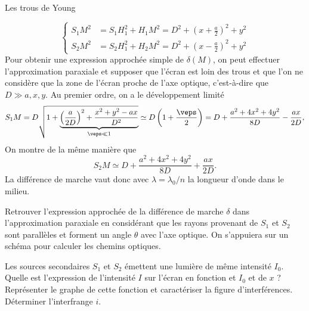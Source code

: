 \begin{exo}[PC][1]{Les trous de Young}
\begin{quest}
{  \begin{equation*}
    \begin{cases}
        S_1 M^2 & = S_1H_1^2 +H_1M^2 = D^2 + (x + \frac{a}{2})^2 + y^2 \\ 
        S_2 M^2 & = S_2H_1^2 +H_2M^2 = D^2 + (x - \frac{a}{2})^2 + y^2
    \end{cases}
    \end{equation*}
  Pour obtenir une expression approchée simple de $\delta(M)$, on peut effectuer l'approximation paraxiale et supposer que l'écran est loin des trous et que l'on ne considère que la zone de l'écran proche de l'axe optique, c'est-à-dire que $D \gg a,x,y$.
   Au premier ordre, on a le développement limité
  \begin{equation}
  S_1 M = D\sqrt{1+\underbrace{\left(\frac{a}{2D}\right)^2+\dfrac{x^2 + y^2 - ax}{D^2}}_{\veps \ll 1}}\simeq D\left(1 +\frac{\veps}{2}\right) = D + \dfrac{a^2+4x^2 + 4y^2}{8D}-\frac{ax}{2D},
  \end{equation}
  On montre de la même manière que
  \begin{equation}
  S_2 M\simeq D+\dfrac{a^2+4x^2 + 4y^2}{8D}+\frac{ax}{2D}.
  \end{equation}
  La différence de marche vaut donc
  avec $\lambda = \lambda_0/n$ la longueur d'onde dans le milieu.
  

}
\item Retrouver l'expression approchée de la différence de marche $\delta$ dans l'approximation paraxiale en considérant que les rayons provenant de $S_1$ et $S_2$ sont parallèles et forment un angle $\theta$ avec l'axe optique. On s'appuiera sur un schéma pour calculer les chemins optiques.

\item Les sources secondaires $S_1$ et $S_2$ émettent une lumière de même intensité $I_0$. Quelle est l'expression de l'intensité $I$ sur l'écran en fonction et $I_0$ et de $x$ ? Représenter le graphe de cette fonction et caractériser la figure d'interférences. Déterminer l'interfrange $i$.

\end{quest}
\end{exo}



